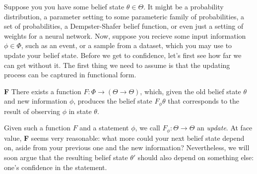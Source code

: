 \documentclass{article}
\begin{document}
Suppose you you have some belief state $\theta \in \Theta$. 
It might be 
a probability distribution, a parameter setting to some parameteric family of probabilities, a set of probabilities, a Dempster-Shafer belief function, or even just a setting of weights for a neural network. 
Now, suppose you recieve some input information $\phi \in \Phi$, such as an event, or a sample from a dataset, which you may use to update your belief state. 
%
Before we get to confidence, let's first see how far we can get without it.
The first thing we need to assume is that the updating process can be captured in functional form. 
\begin{CFaxioms}
	\item[\textbf{F}] 
		There exists a function
		$F : \Phi \to ( \Theta \to \Theta)$,
		which, given the old belief state $\theta$ and new information $\phi$, produces the belief state $F_\phi\theta$ that corresponds to the result of observing $\phi$ in state $\theta$.
\end{CFaxioms}

Given such a function $F$ and a statement $\phi$, we call $F_\phi : \Theta \to \Theta$ an \emph{update}. 
At face value, \textbf{F} seems very reasonable: what more could your next belief state depend on, aside from your previous one and the new information? 
Nevertheless, we will soon argue that the resulting belief state $\theta'$ should also depend on something else: one's confidence in the statement.
\end{document}
